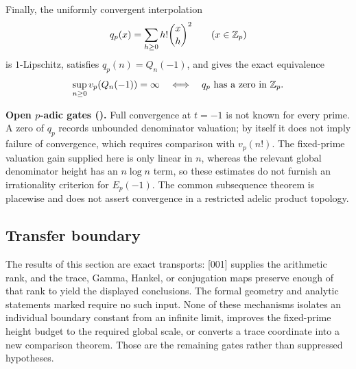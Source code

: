 Finally, the uniformly convergent interpolation
\[
 q_p(x)=\sum_{h\ge0}h!\binom xh^2\qquad(x\in\mathbb Z_p)
\]
is \(1\)-Lipschitz, satisfies \(q_p(n)=Q_n(-1)\), and gives the exact
\UPASS{} equivalence
\[
 \sup_{n\ge0}v_p(Q_n(-1))=\infty
 \quad\Longleftrightarrow\quad
 q_p\text{ has a zero in }\mathbb Z_p.
\]

\begin{statusbox}
\textbf{Open \(p\)-adic gates (\OPEN).}
Full convergence at \(t=-1\) is not known for every prime.  A zero of
\(q_p\) records unbounded denominator valuation; by itself it does not
imply failure of convergence, which requires comparison with
\(v_p(n!)\).  The fixed-prime valuation gain supplied here is only linear
in \(n\), whereas the relevant global denominator height has an
\(n\log n\) term, so these estimates do not furnish an irrationality
criterion for \(E_p(-1)\).  The common subsequence theorem is placewise and
does not assert convergence in a restricted adelic product topology.
\end{statusbox}

\subsection{Transfer boundary}

The results of this section are exact transports: [001] supplies the
arithmetic rank, and the trace, Gamma, Hankel, or conjugation maps preserve
enough of that rank to yield the displayed \RPASS{} conclusions.  The
formal geometry and analytic statements marked \UPASS{} require no such
input.  None of these mechanisms isolates an individual boundary constant
from an infinite limit, improves the fixed-prime height budget to the
required global scale, or converts a trace coordinate into a new comparison
theorem.  Those are the remaining gates rather than suppressed hypotheses.
